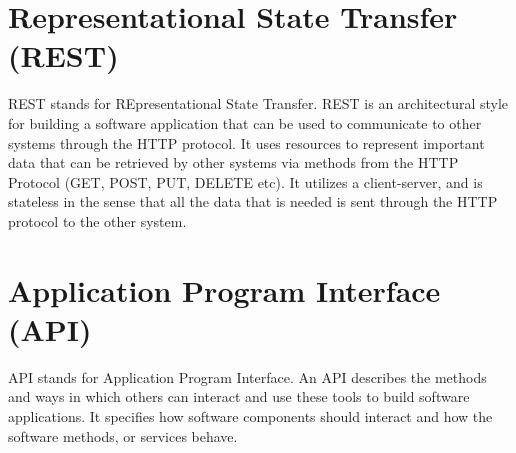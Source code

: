 
\section{Representational State Transfer (REST)}

REST stands for REpresentational State Transfer. REST is an architectural style for building a software application that can be used to communicate to other systems through the HTTP protocol. It uses resources to represent important data that can be retrieved by other systems via methods from the HTTP Protocol (GET, POST, PUT, DELETE etc). It utilizes a client-server, and is stateless in the sense that all the data that is needed is sent through the HTTP protocol to the other system.

\section{Application Program Interface (API)}

API stands for Application Program Interface. An API describes the methods and ways in which others can interact and use these tools to build software applications. It specifies how software components should interact and how the software methods, or services behave. 